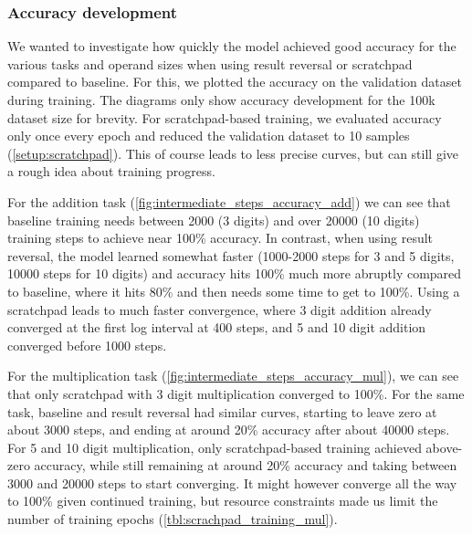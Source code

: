 \begin{table}[!htbp]
	\begin{minipage}[t]{0.47\linewidth}
		\hfill
		\label{tbl:scratchpad_sqrt_baseline}
	\end{minipage}
	\hfill %
	\begin{minipage}[t]{0.47\linewidth}
		\hfill
		\label{tbl:scratchpad_sqrt}
	\end{minipage}
\end{table}

\FloatBarrier
\subsubsection{Accuracy development}
\label{results:rev_scratch_accuracy}


We wanted to investigate how quickly the model achieved good accuracy for the various tasks and operand sizes when using result reversal or scratchpad compared to baseline. For this, we plotted the accuracy on the validation dataset during training.
The diagrams only show accuracy development for the 100k dataset size for brevity.
For scratchpad-based training, we evaluated accuracy only once every epoch and reduced the validation dataset to 10 samples (\cref{setup:scratchpad}). This of course leads to less precise curves, but can still give a rough idea about training progress.

For the addition task (\cref{fig:intermediate_steps_accuracy_add}) we can see that baseline training needs between 2000 (3 digits) and over 20000 (10 digits) training steps to achieve near 100\% accuracy. In contrast, when using result reversal, the model learned somewhat faster (1000-2000 steps for 3 and 5 digits, 10000 steps for 10 digits) and accuracy hits 100\% much more abruptly compared to baseline, where it hits 80\% and then needs some time to get to 100\%.
Using a scratchpad leads to much faster convergence, where 3 digit addition already converged at the first log interval at 400 steps, and 5 and 10 digit addition converged before 1000 steps.

For the multiplication task (\cref{fig:intermediate_steps_accuracy_mul}), we can see that only scratchpad with 3 digit multiplication converged to 100\%. For the same task, baseline and result reversal had similar curves, starting to leave zero at about 3000 steps, and ending at around 20\% accuracy after about 40000 steps.
For 5 and 10 digit multiplication, only scratchpad-based training achieved above-zero accuracy, while still remaining at around 20\% accuracy and taking between 3000 and 20000 steps to start converging.
It might however converge all the way to 100\% given continued training, but resource constraints made us limit the number of training epochs (\cref{tbl:scrachpad_training_mul}).

